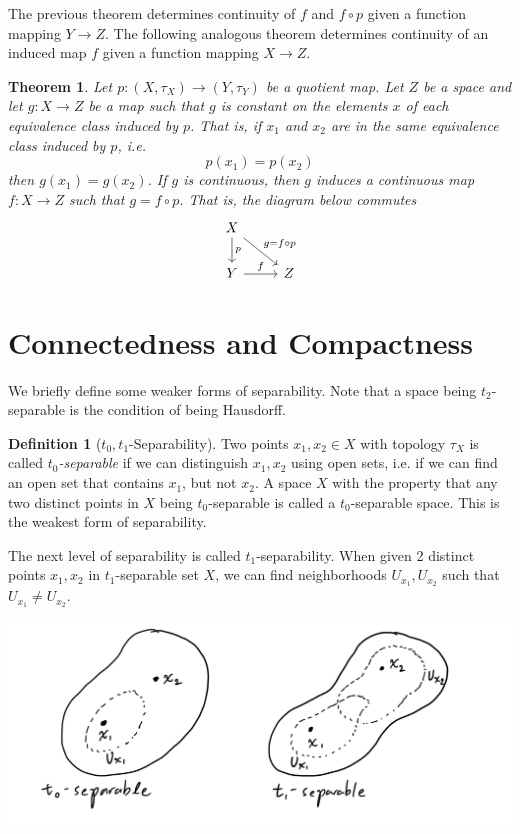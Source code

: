 \documentclass{article}
\newtheorem{theorem}{Theorem}[section]
\theoremstyle{remark}
\theoremstyle{definition}
\newtheorem{definition}{Definition}[section]
\begin{document}
The previous theorem determines continuity of $f$ and $f \circ p$ given a function mapping $Y \longrightarrow Z$. The following analogous theorem determines continuity of an induced map $f$ given a function mapping $X \longrightarrow Z$. 

\begin{theorem}
Let $p: (X, \tau_X )\longrightarrow (Y, \tau_Y)$ be a quotient map. Let $Z$ be a space and let $g: X \longrightarrow Z$ be a map such that $g$ is constant on the elements $x$ of each equivalence class induced by $p$. That is, if $x_1$ and $x_2$ are in the same equivalence class induced by $p$, i.e. 
\[p(x_1) = p(x_2)\]
then $g(x_1) = g(x_2)$. If $g$ is continuous, then $g$ induces a continuous map $f: X \longrightarrow Z$ such that $g = f \circ p$. That is, 
the diagram below commutes 
\[\begin{tikzcd}
    X \arrow{d}{p} \arrow{rd}{g=f \circ p}\\
    Y \arrow{r}{f} & Z
\end{tikzcd}\]
\end{theorem}

\section{Connectedness and Compactness}
We briefly define some weaker forms of separability. Note that a space being $t_2$-separable is the condition of being Hausdorff. 

\begin{definition}[$t_0, t_1$-Separability]
Two points $x_1, x_2 \in X$ with topology $\tau_{X}$ is called $t_0$\textit{-separable} if we can distinguish $x_1, x_2$ using open sets, i.e. if we can find an open set that contains $x_1$, but not $x_2$. A space $X$ with the property that any two distinct points in $X$ being $t_0$-separable is called a $t_0$-separable space. This is the weakest form of separability. 

The next level of separability is called $t_1$-separability. When given 2 distinct points $x_1, x_2$ in $t_1$-separable set $X$, we can find neighborhoods $U_{x_1}, U_{x_2}$ such that $U_{x_1} \neq U_{x_2}$. 
\begin{center}
    \includegraphics[scale=0.25]{img/t0_t1_Separability.PNG}
\end{center}
\end{definition}
\end{document}
